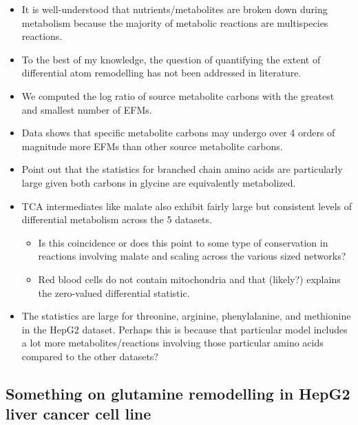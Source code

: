 \documentclass[11pt]{article}
\begin{document}
\begin{itemize}
    \item It is well-understood that nutrients/metabolites are broken down during metabolism because the majority of metabolic reactions are multispecies reactions.
    \item To the best of my knowledge, the question of quantifying the extent of differential atom remodelling has not been addressed in literature.
    \item We computed the log ratio of source metabolite carbons with the greatest and smallest number of EFMs.
    \item Data shows that specific metabolite carbons may undergo over 4 orders of magnitude more EFMs than other source metabolite carbons.
    \item Point out that the statistics for branched chain amino acids are particularly large given both carbons in glycine are equivalently metabolized.
    \item TCA intermediates like malate also exhibit fairly large but consistent levels of differential metabolism across the 5 datasets.
    \begin{itemize}
        \item Is this coincidence or does this point to some type of conservation in reactions involving malate and scaling across the various sized networks?
        \item Red blood cells do not contain mitochondria and that (likely?) explains the zero-valued differential statistic.
    \end{itemize}
    \item The statistics are large for threonine, arginine, phenylalanine, and methionine in the HepG2 dataset. Perhaps this is because that particular model includes a lot more metabolites/reactions involving those particular amino acids compared to the other datasets?
\end{itemize}


\subsection{Something on glutamine remodelling in HepG2 liver cancer cell line}
\end{document}
